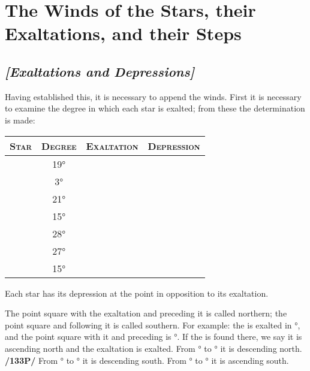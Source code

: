 \section{The Winds of the Stars, their Exaltations, and their Steps}
\subsection{\textit{[Exaltations and Depressions]}}
Having established this, it is necessary to append the winds. First it is necessary to examine the  degree in which each star is exalted; from these the determination is made:

\begin{center}
\begin{tabular}{cccc}
\textsc{Star} & \textsc{Degree} 
	& \textsc{Exaltation} & \textsc{Depression} \\
\toprule
\Sun 		& 19°		& \Aries 			& \Libra			\\
\Moon		&   3° 		& \Taurus			& \Scorpio  		\\
\Saturn		& 21°		& \Libra			& \Aries			\\
\Jupiter		& 15°		& \Cancer			& \Capricorn		\\
\Mars		& 28°		& \Capricorn		& \Cancer 		\\
\Venus		& 27°		& \Pisces			& \Virgo 			\\
\Mercury	& 15°		& \Virgo			& \Pisces			\\
\bottomrule
\end{tabular}
\end{center}

Each star has its depression at the point in opposition to its exaltation.

The point square with the exaltation and preceding it is called northern; the point square and following it is called southern. For example: the \Sun\xspace is exalted in °, and the point square with it and preceding is °. If the \Sun\xspace is found there, we say it is ascending north and the exaltation is exalted. From \Aries\xspace 19° to \Cancer\xspace 19° it is descending north. \textbf{/133P/} From \Cancer\xspace 19° to \Libra\xspace 19° it is descending south. From \Libra\xspace 19° to \Capricorn\xspace 19° it is ascending south.

